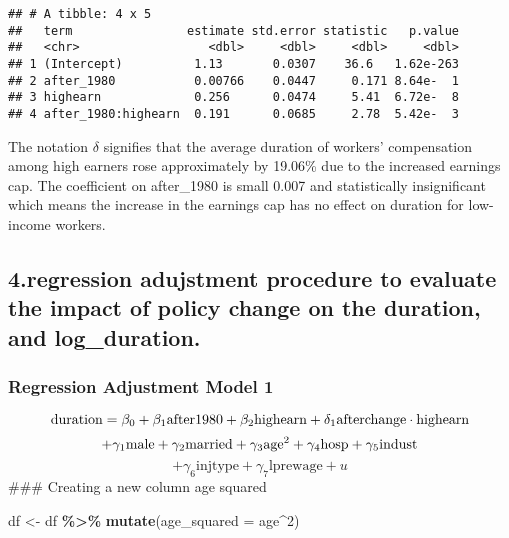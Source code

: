 \documentclass[
]{article}
\newenvironment{Shaded}{\begin{snugshade}}{\end{snugshade}}
\newcommand{\AttributeTok}[1]{\textcolor[rgb]{0.13,0.29,0.53}{#1}}
\newcommand{\DecValTok}[1]{\textcolor[rgb]{0.00,0.00,0.81}{#1}}
\newcommand{\FunctionTok}[1]{\textcolor[rgb]{0.13,0.29,0.53}{\textbf{#1}}}
\newcommand{\NormalTok}[1]{#1}
\newcommand{\OtherTok}[1]{\textcolor[rgb]{0.56,0.35,0.01}{#1}}
\newcommand{\SpecialCharTok}[1]{\textcolor[rgb]{0.81,0.36,0.00}{\textbf{#1}}}
\begin{document}
\begin{verbatim}
## # A tibble: 4 x 5
##   term                estimate std.error statistic   p.value
##   <chr>                  <dbl>     <dbl>     <dbl>     <dbl>
## 1 (Intercept)          1.13       0.0307    36.6   1.62e-263
## 2 after_1980           0.00766    0.0447     0.171 8.64e-  1
## 3 highearn             0.256      0.0474     5.41  6.72e-  8
## 4 after_1980:highearn  0.191      0.0685     2.78  5.42e-  3
\end{verbatim}

The notation \(\delta\) signifies that the average duration of workers'
compensation among high earners rose approximately by 19.06\% due to the
increased earnings cap. The coefficient on after\_1980 is small 0.007
and statistically insignificant which means the increase in the earnings
cap has no effect on duration for low-income workers.

\subsection{4.regression adujstment procedure to evaluate the impact of
policy change on the duration, and
log\_duration.}\label{regression-adujstment-procedure-to-evaluate-the-impact-of-policy-change-on-the-duration-and-log_duration.}

\subsubsection{Regression Adjustment Model
1}\label{regression-adjustment-model-1}

\[
\text{duration} = \beta_0 + \beta_1 \text{after1980} + \beta_2 \text{highearn} + \delta_1 \text{afterchange} \cdot \text{highearn} \\\]
\[+ \gamma_1\text{male} + \gamma_2\text{married} + \gamma_3\text{age}^2 + \gamma_4\text{hosp} + \gamma_5\text{indust} \\\]
\[+ \gamma_6\text{injtype} + \gamma_7\text{lprewage}+ u\] \#\#\#
Creating a new column age squared

\begin{Shaded}
\begin{Highlighting}[]
\NormalTok{df }\OtherTok{\textless{}{-}}\NormalTok{ df }\SpecialCharTok{\%\textgreater{}\%} \FunctionTok{mutate}\NormalTok{(}\AttributeTok{age\_squared =}\NormalTok{ age}\SpecialCharTok{\^{}}\DecValTok{2}\NormalTok{)}
\end{Highlighting}
\end{Shaded}
\end{document}
